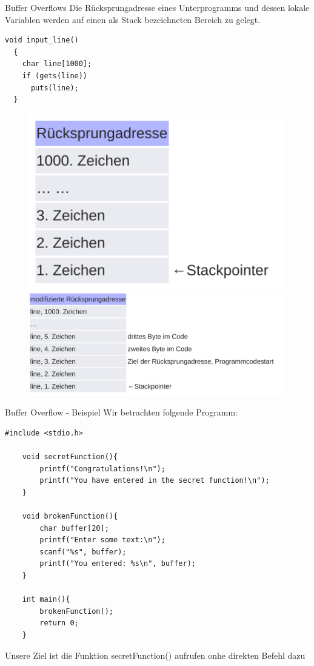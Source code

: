 \documentclass[10pt]{beamer}
\begin{document}
\begin{frame}[fragile]{Buffer Overflows}
 Die R\"ucksprungadresse eines Unterprogramms und dessen lokale Variablen werden auf einen als Stack bezeichneten Bereich zu gelegt.
 \begin{lstlisting}[style=CStyle]
  void input_line()
  {
    char line[1000];
    if (gets(line))
      puts(line);
  }
 \end{lstlisting}

 \begin{figure}%
  \centering
  {\includegraphics[scale=0.10]{stackoverflow}}%
  \quad
  {\includegraphics[scale=0.10]{stackoverflow_2}}%
 \end{figure}
\end{frame}

\begin{frame}[fragile]{Buffer Overflow - Beispiel}
  Wir betrachten folgende Programm:
  \begin{lstlisting}[style=C2Style]
    #include <stdio.h>

    void secretFunction(){
        printf("Congratulations!\n");
        printf("You have entered in the secret function!\n");
    }

    void brokenFunction(){
        char buffer[20];
        printf("Enter some text:\n");
        scanf("%s", buffer);
        printf("You entered: %s\n", buffer);    
    }

    int main(){
        brokenFunction();
        return 0;
    }

  \end{lstlisting}
  Unsere Ziel ist die Funktion secretFunction() aufrufen onhe direkten Befehl dazu
\end{frame}
\end{document}
